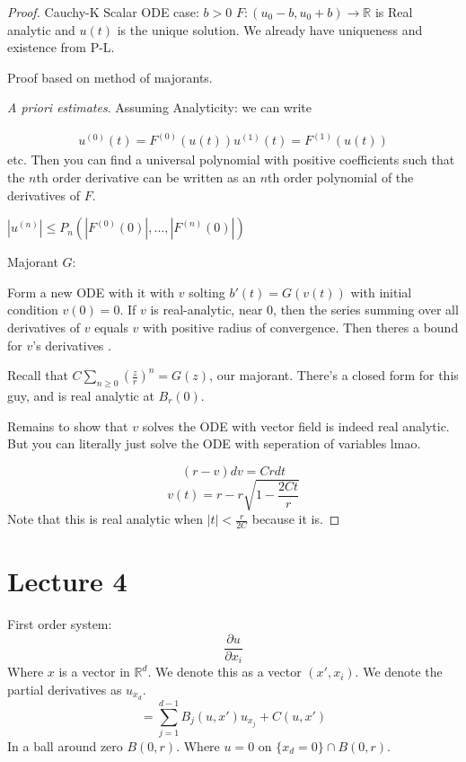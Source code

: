 \documentclass{article}
\numberwithin{equation}{section}
\theoremstyle{definition}
\newcommand{\R}{\mathbb{R}}
\newcommand{\pp}[2]{\frac{\partial #1}{\partial #2}}
\newcommand{\set}[1]{\{#1\}}
\begin{document}
\begin{proof}
    Cauchy-K
    Scalar ODE case:
    $b>0$
    $F: (u_0-b,u_0+b) \to \R$ is Real analytic and $u(t)$ is the unique solution. We already have uniqueness and existence from P-L.

    Proof based on method of majorants.

    \textit{A priori estimates}. Assuming Analyticity: we can write
    
    \begin{align}
        u^{(0)}(t) = F^{(0)}(u(t))
        u^{(1)}(t)  = F^{(1)}(u(t))
    \end{align}
    etc.
    Then you can find a universal polynomial with positive coefficients such that the $n$th order derivative can be written as an $n$th order polynomial of the derivatives of $F$.

    $|u^{(n)}| \leq P_n(|F^{(0)}(0)|, ..., |F^{(n)}(0)|)$


    Majorant $G$: 

    Form a new ODE with it with $v$ solting $b'(t) = G(v(t))$ with initial condition $v(0)=0$.
    If $v$ is real-analytic, near $0$, then the series summing over all derivatives of $v$ equals $v$ with positive radius of convergence. Then theres a bound for $v$'s derivatives .


    Recall that $C \sum_{n \geq 0} (\frac zr)^n = G(z)$, our majorant. There's a closed form for this guy, and is real analytic at $B_r(0)$.


    Remains to show that $v$ solves the ODE with vector field is indeed real analytic. But you can literally just solve the ODE with seperation of variables lmao.

    \begin{equation}
        (r-v) dv = Crdt
    \end{equation}
    \begin{equation}
        v(t) = r - r\sqrt{1-\frac{2Ct}{r}}
    \end{equation}
    Note that this is real analytic when $|t| < \frac{r}{2C}$ because it is.

\end{proof}


\section{Lecture 4}
First order system:
\begin{equation}
    \pp{u}{x_i}
\end{equation}
Where $x$ is a vector in $\R^d$. We denote this as a vector $(x', x_i)$. We denote the partial derivatives as $u_{x_d}$.
\begin{equation}
    =\sum_{j=1}^{d-1} B_j(u,x') u_{x_j} + C(u,x')
\end{equation}
In a ball around zero $B(0,r)$.
Where $u=0$ on $\set{x_d = 0} \cap B(0,r)$.
\end{document}
